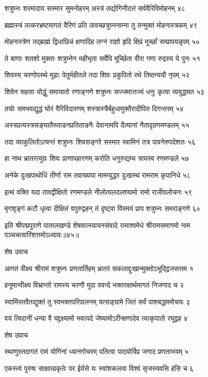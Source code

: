 शत्रुघ्नः शरमादाय सस्मार सुमनोहरम्
अस्त्रं तद्योगिनीदत्तं सर्ववैरिविमोहनम् ४८

ब्रह्मास्त्रं तत्करभ्रष्टमागतं वैरिणं प्रति
तावच्छत्रुघ्ननाम्ना तु तन्मुक्तं मोहनास्त्रकम् ४९

मोहनास्त्रेण तद्ब्राह्मं द्विधाछिन्नं क्षणादिह
लग्नं राज्ञो हृदि क्षिप्रं मूर्च्छां सम्प्रापयन्नृपम् ५०

ते बाणाः शतशो मुक्ताः शत्रुघ्नेन महीभृता
सर्वेपि मूर्च्छिता वीरा गणा रुद्रस्य ये पुनः ५१

शिवस्य चरणोपस्थे मूढाः पेतुर्महीतले
तदा शिवः प्रकुपितो रथे तिष्ठन्ययौ नृपम् ५२

शिवेन सहसा योद्धुं समायातो रणाङ्गणे
शत्रुघ्नः सज्जमात्तज्यं धनुः कृत्वा व्ययुद्ध्यत ५३

तयोः समभवद्युद्धं घोरं वैरिविदारणम्
शस्त्रास्त्रैर्बहुधामुक्तैरादीपित दिगन्तरम् ५४

अस्त्रप्रत्यस्त्रसङ्घातैस्ताडनप्रतिताडनैः
देवानामपि दैत्यानां नैतादृग्रणमण्डलम् ५५

तदा व्याकुलितोऽत्यन्तं शत्रुघ्नः शिवसङ्गरे
सस्मार स्वामिनं तत्र पावनेरुपदेशतः ५६

हा नाथ भ्रातरत्युग्रः शिवः प्राणापहारणम्
करोति धनुरुद्यम्य त्रायस्व रणमण्डले ५७

अनेके दुःखपाथोधिं तीर्णा राम तवाख्यया
मामप्युद्धर दुःखस्थं रामराम कृपानिधे ५८

इत्थं वक्ति यदा तावद्वीक्षितो रणमण्डले
नीलोत्पलदलश्यामो रामो राजीवलोचनः ५९

मृगशृङ्गं कटौ धृत्वा दीक्षितं वपुरुद्वहन्
तं दृष्ट्वा विस्मयं प्राप शत्रुघ्नः समराङ्गणे ६०

इति श्रीपद्मपुराणे पातालखण्डे शेषवात्स्यायनसंवादे रामाश्वमेधे श्रीरामसमागमो नाम पञ्चचत्वारिंशत्तमोऽध्यायः॥४५॥


शेष उवाच

आगतं वीक्ष्य श्रीरामं शत्रुघ्नः प्रणतार्तिहम्
भ्रातरं सकलाद्दुःखान्मुक्तोऽभूद्द्विजसत्तम १

हनूमान्वीक्ष्य विभ्रान्तो रामस्य चरणौ मुदा
ववन्दे भक्तरक्षार्थमागतं निजगाद च २

स्वामिंस्तवैतद्युक्तं तु स्वभक्तपरिपालनम्
यत्सङ्ग्रामे जितं सर्वं पाशबद्धममोचयः ३

वयं त्विदानीं धन्या वै यद्द्रक्ष्यामो भवत्पदे
जेष्यामोऽरीन्क्षणादेव त्वत्कृपातो रघूद्वह ४

शेष उवाच

स्थाणुस्तदागतं रामं योगिनां ध्यानगोचरम्
पतित्वा पादयोर्विप्र जगाद प्रणताभयम् ५

एकस्त्वं पुरुषः साक्षात्प्रकृतेः पर ईर्यसे
यः स्वांशकलया विश्वं सृजस्यवसि हंसि च ६

